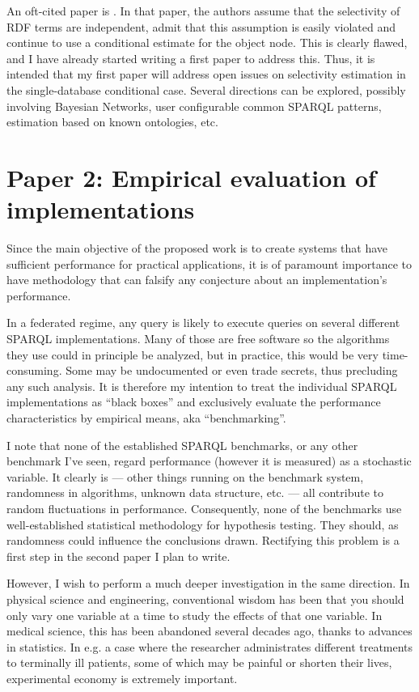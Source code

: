 \documentclass[a4paper,english,10pt]{article}
\begin{document}
An oft-cited paper is \cite{Stocker:2008:SBG:1367497.1367578}. In that
paper, the authors assume that the selectivity of RDF terms are
independent, admit that this assumption is easily violated and
continue to use a conditional estimate for the object node. This is
clearly flawed, and I have already started writing a first paper to
address this. Thus, it is intended that my first paper will address
open issues on selectivity estimation in the single-database
conditional case.  Several directions can be explored, possibly
involving Bayesian Networks, user configurable common SPARQL patterns,
estimation based on known ontologies, etc.

\section*{Paper 2: Empirical evaluation of implementations}

Since the main objective of the proposed work is to create systems
that have sufficient performance for practical applications, it is of
paramount importance to have methodology that can falsify any
conjecture about an implementation's performance.

In a federated regime, any query is likely to execute queries on
several different SPARQL implementations. Many of those are free
software so the algorithms they use could in principle be analyzed,
but in practice, this would be very time-consuming. Some may be
undocumented or even trade secrets, thus precluding any such
analysis. It is therefore my intention to treat the individual SPARQL
implementations as ``black boxes'' and exclusively evaluate the
performance characteristics by empirical means, aka ``benchmarking''.

I note that none of the established SPARQL benchmarks, or any other
benchmark I've seen, regard performance (however it is measured) as a
stochastic variable. It clearly is --- other things running on the
benchmark system, randomness in algorithms, unknown data structure,
etc. --- all contribute to random fluctuations in
performance. Consequently, none of the benchmarks use well-established
statistical methodology for hypothesis testing. They should, as
randomness could influence the conclusions drawn. Rectifying this
problem is a first step in the second paper I plan to write.

However, I wish to perform a much deeper investigation in the same
direction. In physical science and engineering, conventional wisdom
has been that you should only vary one variable at a time to study the
effects of that one variable. In medical science, this has been
abandoned several decades ago, thanks to advances in statistics. In
e.g. a case where the researcher administrates different treatments to
terminally ill patients, some of which may be painful or shorten their
lives, experimental economy is extremely important.
\end{document}
